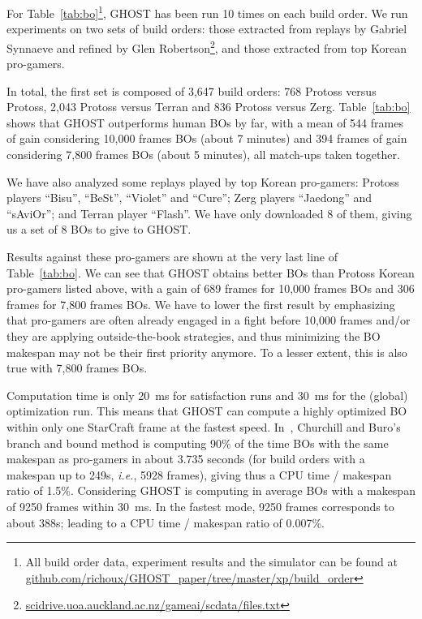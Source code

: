 \documentclass[journal]{IEEEtran}
\newcommand{\ghost}{\textsc{GHOST}\xspace}
\newcommand{\ie}{\textit{i.e.}}
\begin{document}
For  Table~\ref{tab:bo}\footnote{All  build   order  data,  experiment
  results     and     the     simulator    can     be     found     at
  \href{https://github.com/richoux/GHOST\_paper/tree/master/xp/build\_order}{github.com/richoux/GHOST\_paper/tree/master/xp/build\_order}},
\ghost has been  run 10 times on each build  order. We run experiments
on two sets  of build orders: those extracted from  replays by Gabriel
Synnaeve\cite{SynnaeveDataset} and                  refined                  by                  Glen
Robertson\footnote{\href{http://scidrive.uoa.auckland.ac.nz/gameai/scdata/files.txt}{scidrive.uoa.auckland.ac.nz/gameai/scdata/files.txt}},
and those extracted from top Korean pro-gamers.

In total, the first set is  composed of 3,647 build orders: 768 Protoss
versus  Protoss, 2,043  Protoss versus  Terran and  836 Protoss  versus
Zerg.   
Table~\ref{tab:bo}  shows that \ghost
outperforms human BOs by far, with  a mean of 544 frames of gain considering 10,000 frames BOs (about 7 minutes) and 394 frames of
gain considering 7,800 frames BOs (about 5 minutes), all match-ups taken together.

We have also analyzed some replays played by top Korean
pro-gamers: Protoss players ``Bisu'', ``BeSt'', ``Violet'' and ``Cure''; Zerg players ``Jaedong'' and ``sAviOr''; and Terran player
``Flash''. We have only downloaded 8 of them, giving us a set of 8 BOs to give to \ghost.

Results against  these pro-gamers are shown  at the very last  line of
Table~\ref{tab:bo}.  We can see that \ghost obtains better BOs
than  Protoss Korean  pro-gamers listed  above, with  a gain  of 689 frames for  10,000 frames BOs  and 306 frames for 7,800  frames BOs.  We  have to  lower the  first result  by
emphasizing that pro-gamers are often  already engaged in a fight before
10,000 frames and/or they are applying outside-the-book strategies, and thus
minimizing the BO makespan may not be their first priority anymore. To
a lesser extent, this is also true with 7,800 frames BOs.

Computation time is  only 20~ms for satisfaction runs and  30~ms for the
(global) optimization run. This means that \ghost can compute a highly
optimized BO  within only one StarCraft frame  at the fastest
speed. In~\cite{ChurchillB11},  Churchill and Buro's branch  and bound
method  is computing  90\%  of the  time BOs  with the  same
makespan as pro-gamers in about 3.735 seconds (for build orders with a
makespan  up to  249s, \ie, 5928 frames), giving  thus a  CPU time  / makespan  ratio of
1.5\%. Considering \ghost is computing  in average BOs with a
makespan of  9250 frames within  30~ms. In  the fastest
mode, 9250 frames corresponds to about 388s; leading to
a CPU time / makespan ratio of 0.007\%.
\end{document}

